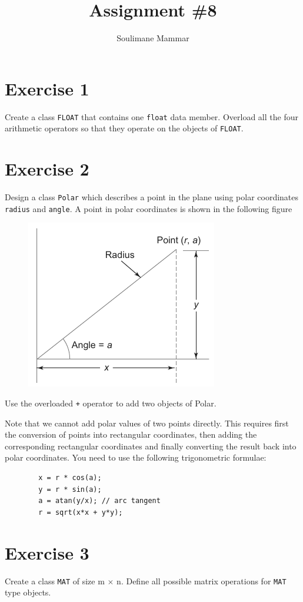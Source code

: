 \documentclass[10pt,a4paper]{article}
\title{Assignment \#8}
\author{Soulimane Mammar}
\begin{document}
	\maketitle
	\section*{Exercise 1}
	Create a class \verb|FLOAT| that contains one \verb|float| data member. Overload all the four arithmetic operators so that they operate on the objects of \verb|FLOAT|.
	\section*{Exercise 2}
	Design a class \verb|Polar| which describes a point in the plane using polar coordinates \verb|radius| and \verb|angle|. A point in polar coordinates is shown in the following figure
	\begin{figure}[H]
		\centering
		\includegraphics[width=0.5\linewidth]{polar_coordinates}
	\end{figure}
	\noindent Use the overloaded \verb|+| operator to add two objects of Polar. 
	
	\noindent Note that we cannot add polar values of two points directly. This requires first the conversion of points into rectangular coordinates, then adding the corresponding rectangular coordinates and finally converting the result back into polar coordinates. You need to use the following trigonometric formulae:
	\begin{verbatim}
		x = r * cos(a); 
		y = r * sin(a); 
		a = atan(y/x); // arc tangent 
		r = sqrt(x*x + y*y); 
	\end{verbatim}
	
	\section*{Exercise 3}
	Create a class \verb|MAT| of size m $\times$ n. Define all possible matrix operations for \verb|MAT| type objects.
	
\end{document}
